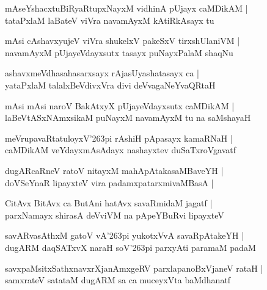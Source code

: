\documentclass[twoside,12pt,openright]{book}
\def\S{\char'263}
\newcounter{shloka}[chapter]
\begin{document}
\begin{shloka}%
mAseYshacxtuBiRyaRtupxNayxM vidhinA pUjayx caMDikAM |\\
tataPxlaM laBateV viVra navamAyxM kAtiRkAsayx tu 
\end{shloka}

\begin{shloka}%
mAsi cAshavxyujeV viVra shukelxV pakeSxV tirxshUlaniVM |\\
navamAyxM pUjayeVdayxsutx tasayx puNayxPalaM shaqNu
\end{shloka}

\begin{shloka}%
ashavxmeVdhasahasarxsayx rAjasUyashatasayx ca |\\
yataPxlaM talalxBeVdivxVra divi deVvagaNeYvaQRtaH 
\end{shloka}

\begin{shloka}%
mAsi mAsi naroV BakAtxyX pUjayeVdayxsutx caMDikAM |\\
laBeVtASxNAmxsikaM puNayxM navamAyxM tu na saMshayaH
\end{shloka}

\begin{shloka}%
meVrupavaRtatuloyxV\S pi rAshiH pApasayx kamaRNaH |\\
caMDikAM veYdayxmAsAdayx nashayxtev duSaTxroVgavatf 
\end{shloka}

\begin{shloka}%
dugARcaRneV ratoV nitayxM mahApAtakasaMBaveYH |\\
doVSeYnaR lipayxteV vira padamxpatarxmivaMBasA |\\
\end{shloka}

\begin{shloka}%
CitAvx BitAvx ca ButAni hatAvx savaRmidaM jagatf |\\
parxNamayx shirasA deVviVM na pApeYBuRvi lipayxteV 
\end{shloka}

\begin{shloka}%
savARvasAthxM gatoV vA\S pi yukotxVvA savaRpAtakeYH |\\
dugARM daqSATxvX naraH soV\S pi parxyAti paramaM padaM 
\end{shloka}

\begin{shloka}%
savxpaMsitxSathxnavxrXjanAmxgeRV parxlapanoBxVjaneV rataH |\\
samxrateV satataM dugARM sa ca muceyxVta baMdhanatf 
\end{shloka}
\end{document}
